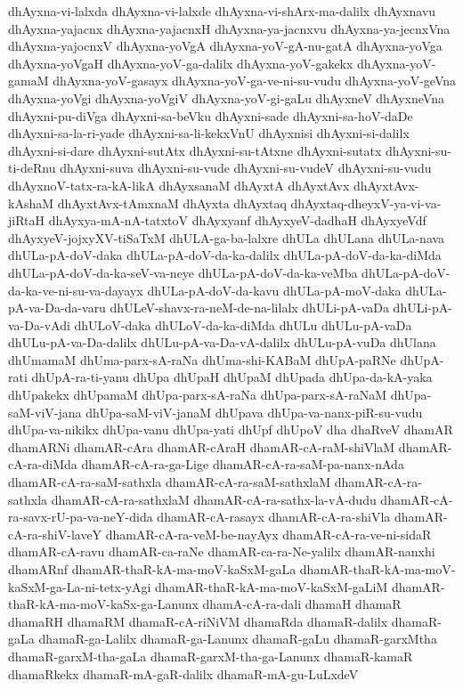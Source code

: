 {dhAyxna-vi-lalxda
dhAyxna-vi-lalxde
dhAyxna-vi-shArx-ma-dalilx
dhAyxnavu
dhAyxna-yajacnx
dhAyxna-yajacnxH
dhAyxna-ya-jacnxvu
dhAyxna-ya-jecnxVna
dhAyxna-yajocnxV
dhAyxna-yoVgA
dhAyxna-yoV-gA-nu-gatA
dhAyxna-yoVga
dhAyxna-yoVgaH
dhAyxna-yoV-ga-dalilx
dhAyxna-yoV-gakekx
dhAyxna-yoV-gamaM
dhAyxna-yoV-gasayx
dhAyxna-yoV-ga-ve-ni-su-vudu
dhAyxna-yoV-geVna
dhAyxna-yoVgi
dhAyxna-yoVgiV
dhAyxna-yoV-gi-gaLu
dhAyxneV
dhAyxneVna
dhAyxni-pu-diVga
dhAyxni-sa-beVku
dhAyxni-sade
dhAyxni-sa-hoV-daDe
dhAyxni-sa-la-ri-yade
dhAyxni-sa-li-kekxVnU
dhAyxnisi
dhAyxni-si-dalilx
dhAyxni-si-dare
dhAyxni-sutAtx
dhAyxni-su-tAtxne
dhAyxni-sutatx
dhAyxni-su-ti-deRnu
dhAyxni-suva
dhAyxni-su-vude
dhAyxni-su-vudeV
dhAyxni-su-vudu
dhAyxnoV-tatx-ra-kA-likA
dhAyxsanaM
dhAyxtA
dhAyxtAvx
dhAyxtAvx-kAshaM
dhAyxtAvx-tAmxnaM
dhAyxta
dhAyxtaq
dhAyxtaq-dheyxV-ya-vi-va-jiRtaH
dhAyxya-mA-nA-tatxtoV
dhAyxyanf
dhAyxyeV-dadhaH
dhAyxyeVdf
dhAyxyeV-jojxyXV-tiSaTxM
dhULA-ga-ba-lalxre
dhULa
dhULana
dhULa-nava
dhULa-pA-doV-daka
dhULa-pA-doV-da-ka-dalilx
dhULa-pA-doV-da-ka-diMda
dhULa-pA-doV-da-ka-seV-va-neye
dhULa-pA-doV-da-ka-veMba
dhULa-pA-doV-da-ka-ve-ni-su-va-dayayx
dhULa-pA-doV-da-kavu
dhULa-pA-moV-daka
dhULa-pA-va-Da-da-varu
dhULeV-shavx-ra-neM-de-na-lilalx
dhULi-pA-vaDa
dhULi-pA-va-Da-vAdi
dhULoV-daka
dhULoV-da-ka-diMda
dhULu
dhULu-pA-vaDa
dhULu-pA-va-Da-dalilx
dhULu-pA-va-Da-vA-dalilx
dhULu-pA-vuDa
dhUlana
dhUmamaM
dhUma-parx-sA-raNa
dhUma-shi-KABaM
dhUpA-paRNe
dhUpA-rati
dhUpA-ra-ti-yanu
dhUpa
dhUpaH
dhUpaM
dhUpada
dhUpa-da-kA-yaka
dhUpakekx
dhUpamaM
dhUpa-parx-sA-raNa
dhUpa-parx-sA-raNaM
dhUpa-saM-viV-jana
dhUpa-saM-viV-janaM
dhUpava
dhUpa-va-nanx-piR-su-vudu
dhUpa-va-nikikx
dhUpa-vanu
dhUpa-yati
dhUpf
dhUpoV
dha
dhaRveV
dhamAR
dhamARNi
dhamAR-cAra
dhamAR-cAraH
dhamAR-cA-raM-shiVlaM
dhamAR-cA-ra-diMda
dhamAR-cA-ra-ga-Lige
dhamAR-cA-ra-saM-pa-nanx-nAda
dhamAR-cA-ra-saM-sathxla
dhamAR-cA-ra-saM-sathxlaM
dhamAR-cA-ra-sathxla
dhamAR-cA-ra-sathxlaM
dhamAR-cA-ra-sathx-la-vA-dudu
dhamAR-cA-ra-savx-rU-pa-va-neY-dida
dhamAR-cA-rasayx
dhamAR-cA-ra-shiVla
dhamAR-cA-ra-shiV-laveY
dhamAR-cA-ra-veM-be-nayAyx
dhamAR-cA-ra-ve-ni-sidaR
dhamAR-cA-ravu
dhamAR-ca-raNe
dhamAR-ca-ra-Ne-yalilx
dhamAR-nanxhi
dhamARnf
dhamAR-thaR-kA-ma-moV-kaSxM-gaLa
dhamAR-thaR-kA-ma-moV-kaSxM-ga-La-ni-tetx-yAgi
dhamAR-thaR-kA-ma-moV-kaSxM-gaLiM
dhamAR-thaR-kA-ma-moV-kaSx-ga-Lanunx
dhamA-cA-ra-dali
dhamaH
dhamaR
dhamaRH
dhamaRM
dhamaR-cA-riNiVM
dhamaRda
dhamaR-dalilx
dhamaR-gaLa
dhamaR-ga-Lalilx
dhamaR-ga-Lanunx
dhamaR-gaLu
dhamaR-garxMtha
dhamaR-garxM-tha-gaLa
dhamaR-garxM-tha-ga-Lanunx
dhamaR-kamaR
dhamaRkekx
dhamaR-mA-gaR-dalilx
dhamaR-mA-gu-LuLxdeV
}
